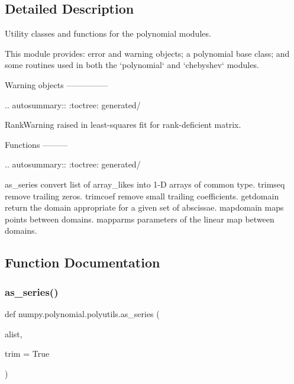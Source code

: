 \subsection{Detailed Description}
\begin{DoxyVerb}Utility classes and functions for the polynomial modules.

This module provides: error and warning objects; a polynomial base class;
and some routines used in both the `polynomial` and `chebyshev` modules.

Warning objects
---------------

.. autosummary::
   :toctree: generated/

   RankWarning  raised in least-squares fit for rank-deficient matrix.

Functions
---------

.. autosummary::
   :toctree: generated/

   as_series    convert list of array_likes into 1-D arrays of common type.
   trimseq      remove trailing zeros.
   trimcoef     remove small trailing coefficients.
   getdomain    return the domain appropriate for a given set of abscissae.
   mapdomain    maps points between domains.
   mapparms     parameters of the linear map between domains.\end{DoxyVerb}
 

\subsection{Function Documentation}
\mbox{\label{namespacenumpy_1_1polynomial_1_1polyutils_ac8218044b08c2be42ae7c5e314dbe83d}} 
\subsubsection{\texorpdfstring{as\+\_\+series()}{as\_series()}}
{\footnotesize\ttfamily def numpy.\+polynomial.\+polyutils.\+as\+\_\+series (\begin{DoxyParamCaption}\item[{}]{alist,  }\item[{}]{trim = {\ttfamily True} }\end{DoxyParamCaption})}

